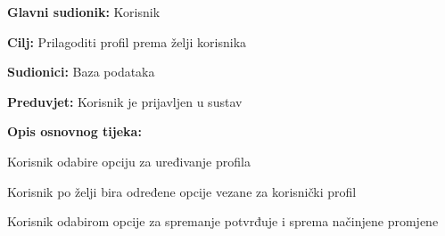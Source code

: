     	\noindent {}
    	\begin{packed_item}
    		
    		\item \textbf{Glavni sudionik: }
    		Korisnik 
    		\item  \textbf{Cilj:} Prilagoditi profil prema želji korisnika
    		\item  \textbf{Sudionici:} Baza podataka
    		\item  \textbf{Preduvjet:} Korisnik je prijavljen u sustav
    		\item  \textbf{Opis osnovnog tijeka:}
    		
    		\item[] \begin{packed_enum}
    			
    			\item Korisnik odabire opciju za uređivanje profila 
    			\item Korisnik po želji bira određene opcije vezane za korisnički profil 
    			\item Korisnik odabirom opcije za spremanje potvrđuje i sprema načinjene promjene
    			
    		\end{packed_enum}
    	\end{packed_item}
    	
